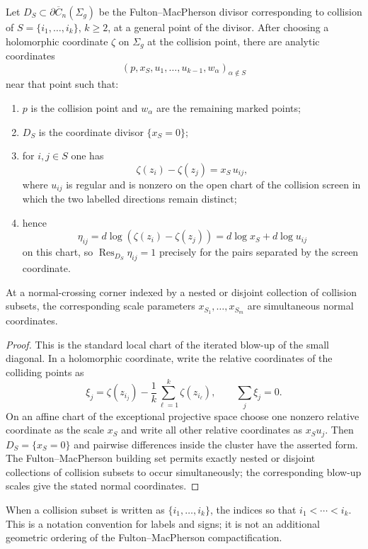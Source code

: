 \begin{theorem}\label{thm:local-coords-boundary}
Let $D_S \subset \partial\overline{C}_n(\Sigma_g)$ be the
Fulton--MacPherson divisor corresponding to collision of
$S=\{i_1,\ldots,i_k\}$, $k\geq 2$, at a general point of the divisor.
After choosing a holomorphic coordinate $\zeta$ on $\Sigma_g$ at the
collision point, there are analytic coordinates
\[
(p,x_S,u_1,\ldots,u_{k-1},w_\alpha)_{\alpha\notin S}
\]
near that point such that:
\begin{enumerate}
\item $p$ is the collision point and $w_\alpha$ are the remaining
 marked points;
\item $D_S$ is the coordinate divisor $\{x_S=0\}$;
\item for $i,j\in S$ one has
 \[
 \zeta(z_i)-\zeta(z_j)=x_S\,u_{ij},
 \]
 where $u_{ij}$ is regular and is nonzero on the open chart of the
 collision screen in which the two labelled directions remain distinct;
\item hence
 \[
 \eta_{ij}=d\log(\zeta(z_i)-\zeta(z_j))
 =d\log x_S+d\log u_{ij}
 \]
 on this chart, so $\operatorname{Res}_{D_S}\eta_{ij}=1$ precisely
 for the pairs separated by the screen coordinate.
\end{enumerate}
At a normal-crossing corner indexed by a nested or disjoint collection
of collision subsets, the corresponding scale parameters
$x_{S_1},\ldots,x_{S_m}$ are simultaneous normal coordinates.
\end{theorem}

\begin{proof}
This is the standard local chart of the iterated blow-up of the small
diagonal. In a holomorphic coordinate, write the relative coordinates
of the colliding points as
\[
\xi_j=\zeta(z_{i_j})-\frac1k\sum_{\ell=1}^k\zeta(z_{i_\ell}),
\qquad \sum_j\xi_j=0.
\]
On an affine chart of the exceptional projective space choose one
nonzero relative coordinate as the scale $x_S$ and write all other
relative coordinates as $x_S u_j$. Then $D_S=\{x_S=0\}$ and pairwise
differences inside the cluster have the asserted form. The
Fulton--MacPherson building set permits exactly nested or disjoint
collections of collision subsets to occur simultaneously; the
corresponding blow-up scales give the stated normal coordinates.
\end{proof}

\begin{remark}\label{rem:collision-ordering}
When a collision subset is written as $\{i_1,\ldots,i_k\}$, the
indices so that $i_1<\cdots<i_k$. This is a notation convention for
labels and signs; it is not an additional geometric ordering of the
Fulton--MacPherson compactification.
\end{remark}

